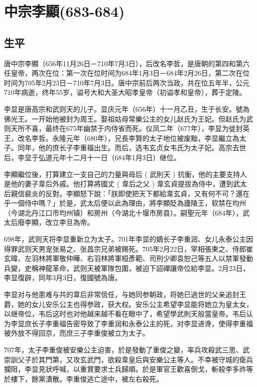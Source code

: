 
\section{中宗李顯\tiny(683-684)}

\subsection{生平}

唐中宗李顯（656年11月26日－710年7月3日），后改名李哲，是唐朝的第四和第六任皇帝，两次在位：第一次在位时间为684年1月3日－684年2月26日，第二次在位时间为705年2月23日－710年7月3日。唐中宗前后两次当政，共在位五年半，公元710年病逝，终年55岁，谥号大和大圣大昭孝皇帝（初谥孝和皇帝），葬于定陵。

李显是唐高宗和武则天的儿子。显庆元年（656年）十一月乙丑，生于长安。號為佛光王。一开始他被封为周王。娶祖姑母常樂公主的女儿赵氏为王妃。但赵氏为武则天所不喜，最终在675年幽禁于内侍省而死。仪凤二年（677年），李显为徙封英王，改名李哲。永隆元年（680年），兄長李賢的太子地位被废黜，李显繼立為太子。同年，他的庶长子李重福出生。而后，选韦玄贞女韦氏为太子妃。高宗去世后，李显于弘道元年十二月十一日（684年1月3日）继位。

李顯繼位後，打算建立一支自己的力量與母后 ( 武則天 ) 抗衡，他的主要支持人是他的妻子韋后外戚。他打算將國丈 ( 韋后之父 ) 韋玄貞提拔為侍中，遭到武太后親信裴炎的反對。李顯怒下說：「朕即使把天下都給韋玄貞，又有何不可？還在乎一個侍中嗎？」於是，武太后便以此為理由，將李顯貶為廬陵王，软禁在均州（今湖北丹江口市均州镇）和房州（今湖北十堰市房县）。嗣聖元年（684年），武太后廢李顯，改立李旦為帝。

698年，武则天将李显重新立为太子。701年李显的嫡长子李重润、女儿永泰公主因得罪武则天男宠张易之、张昌宗兄弟被赐死。705年2月22日，宰相張柬之、侍郎崔玄暐、左羽林將軍敬仲曄、右羽林將軍桓彥範、司刑少卿袁恕己等五人以禁軍發動兵變，史稱神龍革命，武则天被軍隊包圍，被迫下詔禪讓帝位給李显。2月23日，李显復辟，同年3月3日，復國號為唐。

李显对与他患难与共的韋后非常信任，与她同参朝政，将她已過世的父亲追封王爵，她的女儿安乐公主也得参政，获大权。安乐公主希望李显能将她立为皇太女，以继帝位，韦后这时也对他越来越不看在眼中了，希望學武則天般當皇帝。韦后认为李显庶长子李重福告密导致了李重润和永泰公主的死，对李显进谗，使得李重福被外放不得回京，而庶三子李重俊被立为太子。

707年，太子李重俊被安樂公主迫害，於是發動了重俊之變，率兵攻殺武三思、武崇訓父子於其門第，又攻玄武門，欲殺韋皇后與安樂公主等人。不幸被守城的衛兵攔阻，李显見狀呼喊，以重賞要求士兵歸順。於是軍官王歡喜倒戈，斬殺李多祚等於樓下，餘黨潰散。李重俊逃亡途中，被左右殺死。


